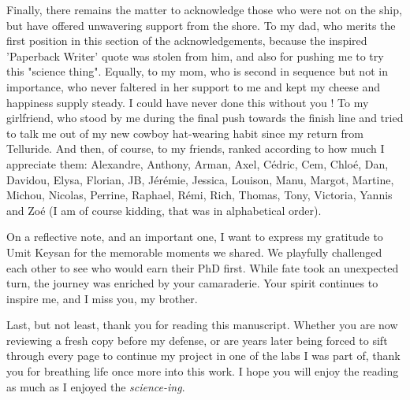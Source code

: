 Finally, there remains the matter to acknowledge those who were not on the ship, but have offered unwavering support from the shore.
To my dad, who merits the first position in this section of the acknowledgements, because the inspired 'Paperback Writer' quote was stolen from him, and also for pushing me to try this "science thing". Equally, to my mom, who is second in sequence but not in importance, who never faltered in her support to me and kept my cheese and happiness supply steady. I could have never done this without you !
To my girlfriend, who stood by me during the final push towards the finish line and tried to talk me out of my new cowboy hat-wearing habit since my return from Telluride.
And then, of course, to my friends, ranked according to how much I appreciate them: Alexandre, Anthony, Arman, Axel, Cédric, Cem, Chloé, Dan, Davidou, Elysa, Florian, JB, Jérémie, Jessica, Louison, Manu, Margot, Martine, Michou, Nicolas, Perrine, Raphael, Rémi, Rich, Thomas, Tony, Victoria, Yannis and Zoé (I am of course kidding, that was in alphabetical order).

On a reflective note, and an important one, I want to express my gratitude to Umit Keysan for the memorable moments we shared. We playfully challenged each other to see who would earn their PhD first. While fate took an unexpected turn, the journey was enriched by your camaraderie. Your spirit continues to inspire me, and I miss you, my brother.

Last, but not least, thank you for reading this manuscript. Whether you are now reviewing a fresh copy before my defense, or are years later being forced to sift through every page to continue my project in one of the labs I was part of, thank you for breathing life once more into this work. I hope you will enjoy the reading as much as I enjoyed the \textit{science-ing}.